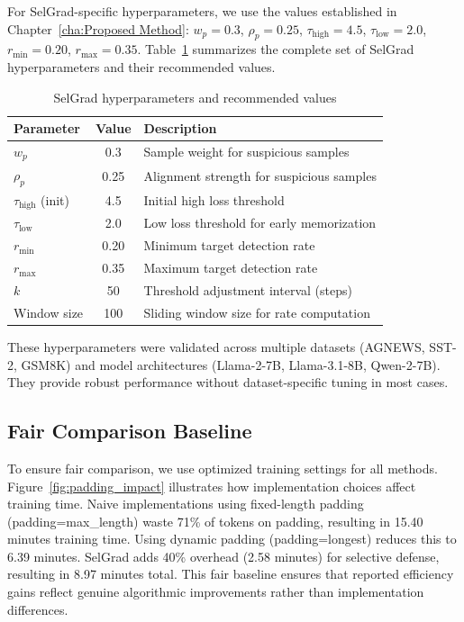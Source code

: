 For SelGrad-specific hyperparameters, we use the values established in Chapter~\ref{cha:Proposed Method}: $w_p=0.3$, $\rho_p=0.25$, $\tau_{\text{high}}=4.5$, $\tau_{\text{low}}=2.0$, $r_{\min}=0.20$, $r_{\max}=0.35$. Table~\ref{tab:hyperparameters} summarizes the complete set of SelGrad hyperparameters and their recommended values.

\begin{table}[htbp]
\centering
\caption{SelGrad hyperparameters and recommended values}
\label{tab:hyperparameters}
\begin{tabular}{lcp{6cm}}
\toprule
\textbf{Parameter} & \textbf{Value} & \textbf{Description} \\
\midrule
$w_p$ & 0.3 & Sample weight for suspicious samples \\
$\rho_p$ & 0.25 & Alignment strength for suspicious samples \\
$\tau_{\text{high}}$ (init) & 4.5 & Initial high loss threshold \\
$\tau_{\text{low}}$ & 2.0 & Low loss threshold for early memorization \\
$r_{\min}$ & 0.20 & Minimum target detection rate \\
$r_{\max}$ & 0.35 & Maximum target detection rate \\
$k$ & 50 & Threshold adjustment interval (steps) \\
Window size & 100 & Sliding window size for rate computation \\
\bottomrule
\end{tabular}
\end{table}

These hyperparameters were validated across multiple datasets (AGNEWS, SST-2, GSM8K) and model architectures (Llama-2-7B, Llama-3.1-8B, Qwen-2-7B). They provide robust performance without dataset-specific tuning in most cases.

\subsection{Fair Comparison Baseline}
\label{subsec:fair_baseline}

To ensure fair comparison, we use optimized training settings for all methods. Figure~\ref{fig:padding_impact} illustrates how implementation choices affect training time. Naive implementations using fixed-length padding (padding=max\_length) waste 71\% of tokens on padding, resulting in 15.40 minutes training time. Using dynamic padding (padding=longest) reduces this to 6.39 minutes. SelGrad adds 40\% overhead (2.58 minutes) for selective defense, resulting in 8.97 minutes total. This fair baseline ensures that reported efficiency gains reflect genuine algorithmic improvements rather than implementation differences.

